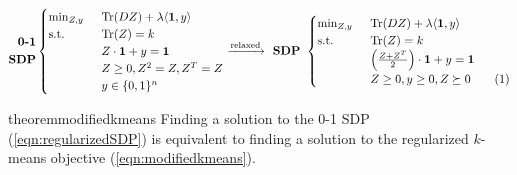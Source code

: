 \documentclass[12pt]{article}
\newcommand{\mb}{\mathbf}
\newcommand{\tr}{\text{Tr}}
\newcommand\numberthis{\addtocounter{equation}{1}\tag{\theequation}}
\begin{document}
\begin{equation*}
	\begin{split}
	\textbf{0-1}\\
	\textbf{SDP}
  \end{split}
	\begin{cases}
		\min_{Z, y} \enspace &\tr(DZ) + \lambda \langle \mb 1, y\rangle\\
		\text{s.t. } \enspace &\tr(Z) = k\\
		& Z\cdot \mb 1 + y = \mb 1\\	
		&Z\ge 0, Z^2 = Z, Z^T = Z \\
		& y \in \{0, 1\}^n
	\end{cases}
	\xrightarrow{\text{relaxed}} \textbf{ SDP } 
	\begin{cases}
		\min_{Z, y} \enspace &\tr(DZ) + \lambda \langle \mb 1, y\rangle\\
        \text{s.t. } \enspace &\tr(Z) = k\\
		& \Big(\frac{Z+Z^T}{2}\Big)\cdot \mb 1 + y = \mb 1\\		
		&Z \ge 0, y \ge 0, Z \succeq 0 \numberthis\label{a-eqn:regularizedSDP}
	\end{cases}
\end{equation*}

\begin{restatable}{theorem}{modifiedkmeans}
\label{a-thm:modifiedkmeans}
Finding a solution to the 0-1 SDP (\ref{eqn:regularizedSDP}) is equivalent to finding a solution to the regularized $k$-means objective (\ref{eqn:modifiedkmeans}). 
\end{restatable}
\end{document}

